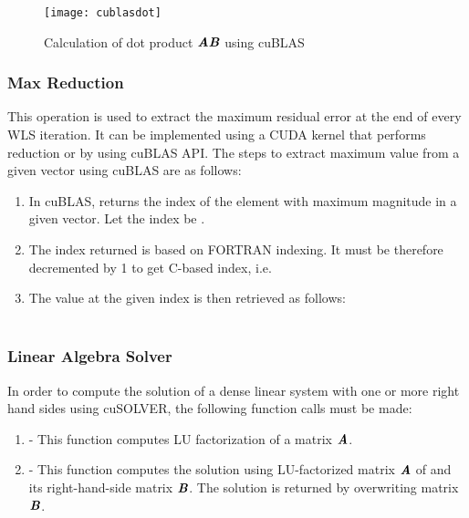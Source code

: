 \documentclass[thesis.tex]{subfiles}
\begin{document}
\begin{figure}[H]
	\centering
	\texttt{[image: cublasdot]}
	\caption{Calculation of dot product $\textbf{\textit{AB}}$ using cuBLAS}
	\label{fig:cublasdot}
\end{figure}

\subsubsection{Max Reduction}
This operation is used to extract the maximum residual error at the end of every WLS iteration. It can be implemented using a CUDA kernel that performs reduction or by using cuBLAS API. The steps to extract maximum value from a given vector using cuBLAS are as follows:
\begin{enumerate}
	\item In cuBLAS,  returns the index of the element with maximum magnitude in a given vector. Let the index be .
	\item The index returned is based on FORTRAN indexing. It must be therefore decremented by 1 to get C-based index, i.e. 
	\item The value at the given index is then retrieved as follows:\\
		\\
\end{enumerate}


\subsubsection{Linear Algebra Solver}
In order to compute the solution of a dense linear system with one or more right hand sides using cuSOLVER, the following function calls must be made:
\begin{enumerate}
	\item {} - This function computes LU factorization of a matrix $\textbf{\textit{A}}$.
	\item {} - This function computes the solution using LU-factorized matrix $\textbf{\textit{A}}$ of and its right-hand-side matrix $\textbf{\textit{B}}$. The solution is returned by overwriting matrix $\textbf{\textit{B}}$.
\end{enumerate}
\end{document}
